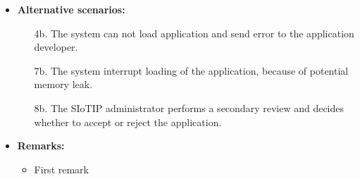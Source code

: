 \begin{itemize}
    \item \textbf{Alternative scenarios:}
    \begin{enumerate}
        \item [4b.] The system can not load application and send error
                    to the application developer.
        \item [7b.] The system interrupt loading of the application,
                    because of potential memory leak.
        \item [8b.] The SIoTIP administrator performs a secondary review and decides whether to accept
                    or reject the application.
    \end{enumerate}

    \item \textbf{Remarks:}
        \begin{itemize}
            \item First remark
        \end{itemize}
\end{itemize}

